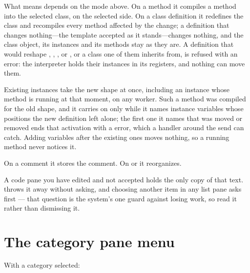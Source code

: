 What  means depends on the mode above. On a method it compiles a
method into the selected class, on the selected side. On a class definition it
redefines the class and recompiles every method affected by the change; a
definition that changes nothing---the template accepted as it stands---changes
nothing, and the class object, its instances and its methods stay as they are.
A definition that would reshape , ,
,  or , or a class one of
them inherits from, is refused with an error: the interpreter holds their
instances in its registers, and nothing can move them.

Existing instances take the new shape at once, including an instance whose
method is running at that moment, on any worker. Such a method was compiled
for the old shape, and it carries on only while it names instance variables
whose positions the new definition left alone; the first one it names that
was moved or removed ends that activation with a  error,
which a handler around the send can catch. Adding variables after the existing
ones moves nothing, so a running method never notices it.

On a comment it stores the comment. On  or  it reorganizes.

\begin{stwarn}
A code pane you have edited and not accepted holds the only copy of that text.
 throws it away without asking, and choosing another item in any
list pane asks first --- that question is the system's one guard against
losing work, so read it rather than dismissing it.
\end{stwarn}

\section{The category pane menu}

With a category selected:

